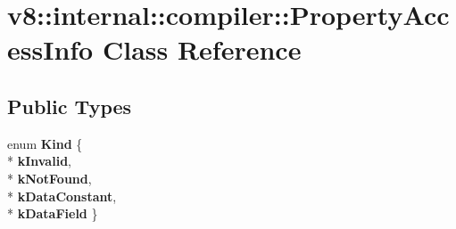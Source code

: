 \hypertarget{classv8_1_1internal_1_1compiler_1_1_property_access_info}{}\section{v8\+:\+:internal\+:\+:compiler\+:\+:Property\+Access\+Info Class Reference}
\label{classv8_1_1internal_1_1compiler_1_1_property_access_info}
\subsection*{Public Types}
\begin{DoxyCompactItemize}
\item 
enum {\bfseries Kind} \{ \\*
{\bfseries k\+Invalid}, 
\\*
{\bfseries k\+Not\+Found}, 
\\*
{\bfseries k\+Data\+Constant}, 
\\*
{\bfseries k\+Data\+Field}
 \}\hypertarget{classv8_1_1internal_1_1compiler_1_1_property_access_info_a2804d5e273b0aa143cd0b33ead05fd3e}{}\label{classv8_1_1internal_1_1compiler_1_1_property_access_info_a2804d5e273b0aa143cd0b33ead05fd3e}

\end{DoxyCompactItemize}
